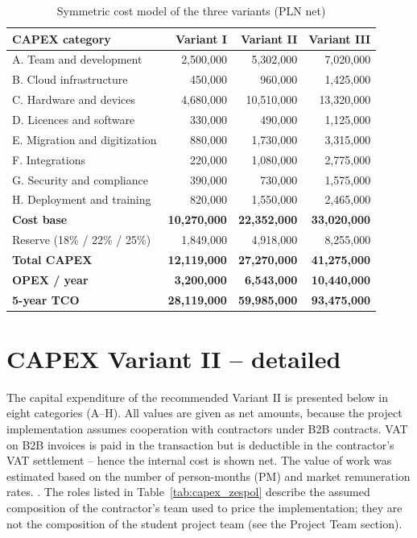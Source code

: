 \begin{table}[h]
\centering
\small
\renewcommand{\arraystretch}{1.2}
\begin{tabular}{|L{6.2cm}|r|r|r|}
\hline
{}\textbf{CAPEX category} & \textbf{Variant I} & \textbf{Variant II} & \textbf{Variant III} \\
\hline
A. Team and development & 2,500,000 & 5,302,000 & 7,020,000 \\
\hline
B. Cloud infrastructure & 450,000 & 960,000 & 1,425,000 \\
\hline
C. Hardware and devices & 4,680,000 & 10,510,000 & 13,320,000 \\
\hline
D. Licences and software & 330,000 & 490,000 & 1,125,000 \\
\hline
E. Migration and digitization & 880,000 & 1,730,000 & 3,315,000 \\
\hline
F. Integrations & 220,000 & 1,080,000 & 2,775,000 \\
\hline
G. Security and compliance & 390,000 & 730,000 & 1,575,000 \\
\hline
H. Deployment and training & 820,000 & 1,550,000 & 2,465,000 \\
\hline
{}\textbf{Cost base} & \textbf{10,270,000} & \textbf{22,352,000} & \textbf{33,020,000} \\
\hline
Reserve (18\% / 22\% / 25\%) & 1,849,000 & 4,918,000 & 8,255,000 \\
\hline
{}\textbf{Total CAPEX} & \textbf{12,119,000} & \textbf{27,270,000} & \textbf{41,275,000} \\
\hline
\textbf{OPEX / year} & \textbf{3,200,000} & \textbf{6,543,000} & \textbf{10,440,000} \\
\hline
{}\textbf{5-year TCO} & \textbf{28,119,000} & \textbf{59,985,000} & \textbf{93,475,000} \\
\hline
\end{tabular}
\caption{Symmetric cost model of the three variants (PLN net)}
\label{tab:trzy_warianty}
\end{table}

\section{CAPEX Variant II -- detailed}
\label{sec:capex_ii}

The capital expenditure of the recommended Variant II is presented below in eight categories (A--H). All values are given as net amounts, because the project implementation assumes cooperation with contractors under B2B contracts. VAT on B2B invoices is paid in the transaction but is deductible in the contractor's VAT settlement -- hence the internal cost is shown net. The value of work was estimated based on the number of person-months (PM) and market remuneration rates. \cite{Hays_2026, NoFluffJobs_2025}. The roles listed in Table~\ref{tab:capex_zespol} describe the assumed composition of the contractor's team used to price the implementation; they are not the composition of the student project team (see the Project Team section).

